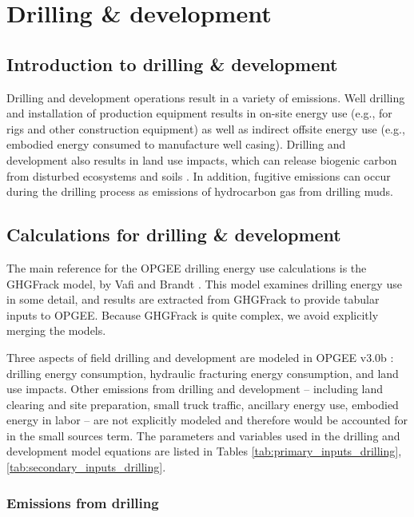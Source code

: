 \documentclass[11pt]{report}
\newcommand{\version}{v3.0b }
\begin{document}
\clearpage
\section{Drilling \& development}\label{sec:drilling}

\subsection{Introduction to drilling \& development}

Drilling and development operations result in a variety of emissions. Well drilling and installation of production equipment results in on-site energy use (e.g., for rigs and other construction equipment) as well as indirect offsite energy use (e.g., embodied energy consumed to manufacture well casing). Drilling and development also results in land use impacts, which can release biogenic carbon from disturbed ecosystems and soils \cite{Yeh2010}. In addition, fugitive emissions can occur during the drilling process as emissions of hydrocarbon gas from drilling muds. 

\subsection{Calculations for drilling \& development}

The main reference for the OPGEE drilling energy use calculations is the GHGFrack model, by Vafi and Brandt \cite{Vafi2016a, Vafi2016b, Vafi2016c}. This model examines drilling energy use in some detail, and results are extracted from GHGFrack to provide tabular inputs to OPGEE. Because GHGFrack is quite complex, we avoid explicitly merging the models.

Three aspects of field drilling and development are modeled in OPGEE \version: drilling energy consumption, hydraulic fracturing energy consumption, and land use impacts. Other emissions from drilling and development -- including land clearing and site preparation, small truck traffic, ancillary energy use, embodied energy in labor -- are not explicitly modeled and therefore would be accounted for in the small sources term. The parameters and variables used in the drilling and development model equations are listed in Tables \ref{tab:primary_inputs_drilling}, \ref{tab:secondary_inputs_drilling}.

\subsubsection{Emissions from drilling}
\end{document}

